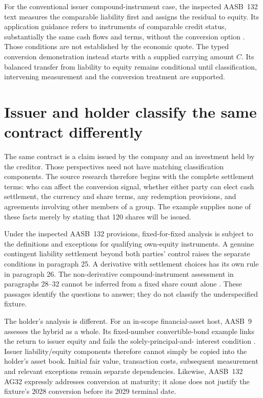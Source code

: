 For the conventional issuer compound-instrument case, the inspected
AASB~132 text measures the comparable liability first and assigns the residual
to equity. Its application guidance refers to instruments of comparable credit
status, substantially the same cash flows and terms, without the conversion
option \citep[paragraphs 31--32 and AG31]{aasb132}. Those conditions are not
established by the economic quote. The typed conversion demonstration instead
starts with a supplied carrying amount $C$. Its balanced transfer from liability
to equity remains conditional until classification, intervening measurement
and the conversion treatment are supported.

\section{Issuer and holder classify the same contract differently}
\label{sim:conversion-authority-scope}
The same contract is a claim issued by the company and an investment held by
the creditor. Those perspectives need not have matching classification
components. The source research therefore begins with the complete settlement
terms: who can affect the conversion signal, whether either party can elect
cash settlement, the currency and share terms, any redemption provisions, and
agreements involving other members of a group. The example supplies none of
these facts merely by stating that 120 shares will be issued.

Under the inspected AASB~132 provisions, fixed-for-fixed analysis is subject
to the definitions and exceptions for qualifying own-equity instruments.
A genuine contingent liability settlement beyond both parties' control raises
the separate conditions in paragraph 25. A derivative with settlement choices
has its own rule in paragraph 26. The non-derivative compound-instrument
assessment in paragraphs 28--32 cannot be inferred from a fixed share count
alone \citep[paragraphs 15--16, 22--26 and 28--32]{aasb132}. These passages identify
the questions to answer; they do not classify the underspecified fixture.

The holder's analysis is different. For an in-scope financial-asset host,
AASB~9 assesses the hybrid as a whole. Its fixed-number convertible-bond
example links the return to issuer equity and fails the solely-principal-and-
interest condition \citep[paragraphs 4.3.2 and B4.1.14, Instrument F]{aasb9scope2026}.
Issuer liability/equity components therefore cannot simply be copied into the
holder's asset book. Initial fair value, transaction costs, subsequent
measurement and relevant exceptions remain separate dependencies. Likewise,
AASB~132 AG32 expressly addresses conversion at maturity; it alone does not
justify the fixture's 2028 conversion before its 2029 terminal date.

